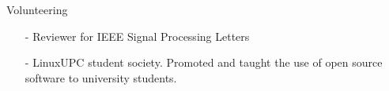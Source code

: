 \documentclass{resume} %
\begin{document}

\begin{rSection}{Volunteering}

\begin{itemize}
\setlength{\itemindent}{-.2in}
  \item[-] Reviewer for IEEE Signal Processing Letters
  \item[-] LinuxUPC student society. Promoted and taught the use of open source software to university students.
\end{itemize}

\vspace{-1pt}

\end{rSection}
\end{document}
